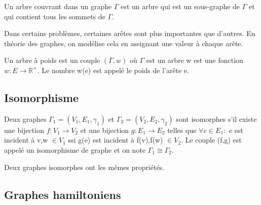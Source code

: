 \begin{defn}
Un arbre couvrant dans un graphe $\Gamma$ est un arbre qui est un sous-graphe de $\Gamma$ et qui contient tous les sommets de $\Gamma$.
\end{defn}

Dans certains problèmes, certaines arêtes sont plus importantes que d'autres. En théorie des graphes, on modélise cela en assignant une valeur à chaque arête. 

\begin{defn}
Un arbre à poids est un couple $(\Gamma,w)$ où $\Gamma$ est un arbre w est une fonction $w: E \rightarrow \mathbb{R}^{+}$. Le nombre w(e) est appelé le poids de l'arête e.
\end{defn}

\begin{exmp}

\end{exmp}




\subsection{Isomorphisme}

\begin{defn}
Deux graphes $\Gamma_{1} = (V_{1},E_{1},\gamma_{1})$ et $\Gamma_{2} = (V_{2},E_{2},\gamma_{2})$ sont isomorphes s'il existe une bijection $f: V_{1} \rightarrow V_{2}$ et une bijection $g: E_{1} \rightarrow E_{2}$ telles que $\forall e \in E_{1}:$ e est incident à v,w $\in V_{1}$ ssi g(e) est incident à f(v),f(w) $\in V_{2}$. Le couple (f,g) est appelé un isomorphisme de graphe et on note $\Gamma_{1} \cong \Gamma_{2}$.
\end{defn}

Deux graphes isomorphes ont les mêmes propriétés.

\begin{exmp}

\end{exmp}



\newpage


\subsection{Graphes hamiltoniens}

